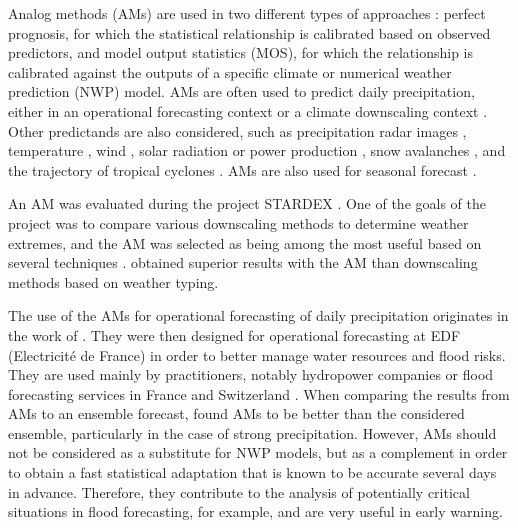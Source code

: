 \documentclass[gmdd]{copernicus}
\begin{document}
Analog methods (AMs) are used in two different types of approaches \citep{Rummukainen1997}: perfect prognosis, for which the statistical relationship is calibrated based on observed predictors, and model output statistics (MOS), for which the relationship is calibrated against the outputs of a specific climate or numerical weather prediction (NWP) model. AMs are often used to predict daily precipitation, either in an operational forecasting context \citep[e.g.][]{Guilbaud1997, Bontron2005, Hamill2006, Bliefernicht2010, Marty2012, Horton2012, Hamill2015, BenDaoud2016} or a climate downscaling context \citep[e.g.][]{Zorita1999, Wetterhall2005, Wetterhall2007, Matulla2007, Radanovics2013, Chardon2014, Dayon2015, Raynaud2016b}. Other predictands are also considered, such as precipitation radar images \citep{Panziera2011,Foresti2015a}, temperature \citep{Radinovic1975, Woodcock1980, Kruizinga1983, DelleMonache2013, Caillouet2016, Raynaud2016b}, wind \citep{Gordon1987, DelleMonache2013, DelleMonache2011, Vanvyve2015, Alessandrini2015, Junk2015, Junk2015c}, solar radiation or power production \citep{Alessandrini2015a, Bessa2015, Raynaud2016b}, snow avalanches \citep{Obled1980, Bolognesi1993}, and the trajectory of tropical cyclones \citep{Keenan1981, Sievers2000, Fraedrich2003}. AMs are also used for seasonal forecast \citep{Barnston1994, Xavier2007, Charles2012, Wu2012, Shao2013}.

An AM was evaluated during the project STARDEX \citep[\textit{STAtistical and Regional dynamical Downscaling of EXtremes for European regions}, see][]{Goodess2003, Stardex2005}. One of the goals of the project was to compare various downscaling methods to determine weather extremes, and the AM was selected as being among the most useful based on several techniques \citep{Maheras2005, Schmidli2007}. \citet{Bliefernicht2010} obtained superior results with the AM than downscaling methods based on weather typing.

The use of the AMs for operational forecasting of daily precipitation originates in the work of \citet{Duband1970, Duband1974, Duband1981}. They were then designed for operational forecasting at EDF (Electricit\'{e} de France) in order to better manage water resources and flood risks. They are used mainly by practitioners, notably hydropower companies \citep{Desaint2008a, BenDaoud2009, Obled2014} or flood forecasting services in France and Switzerland \citep{Marty2010, GarciaHernandez2009b, Horton2012}. When comparing the results from AMs to an ensemble forecast, \citet{Marty2010} found AMs to be better than the considered ensemble, particularly in the case of strong precipitation. However, AMs should not be considered as a substitute for NWP models, but as a complement in order to obtain a fast statistical adaptation that is known to be accurate several days in advance. Therefore, they contribute to the analysis of potentially critical situations in flood forecasting, for example, and are very useful in early warning.
\end{document}
